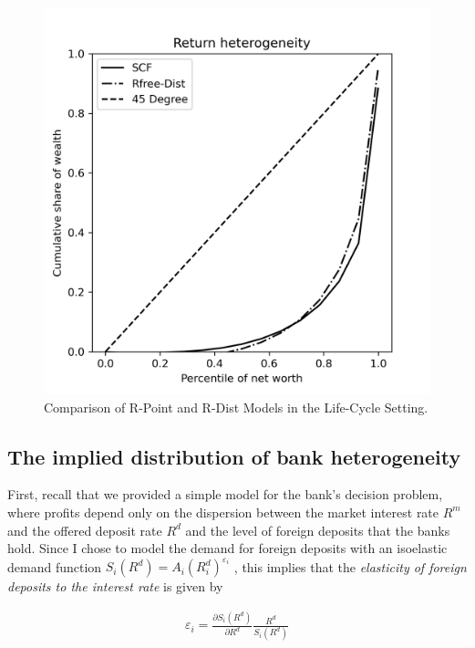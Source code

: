 \begin{figure}[h]
\begin{minipage}{0.48\textwidth}
        \includegraphics[width=\textwidth]{../Figures/LCrrDistNetWorthPlot.png}
    \end{minipage}
    \caption{Comparison of R-Point and R-Dist Models in the Life-Cycle Setting.}
    \label{fig:LCUnif} 
  \end{figure}

  \subsection{The implied distribution of bank heterogeneity}

  \par First, recall that we provided a simple model for the bank's decision problem, where profits depend only on the dispersion between the market interest rate $R^m$ and the offered deposit rate $R^d$ and the level of foreign deposits that the banks hold. Since I chose to model the demand for foreign deposits with an isoelastic demand function $S_i(R^d) = A_i (R_i^d)^{\varepsilon_i}$ , this implies that the \textit{elasticity of foreign deposits to the interest rate} is given by

  \begin{align}
    \varepsilon_i = \frac{\partial S_i(R^d)}{\partial R^d} \frac{R^d}{S_i(R^d)}
  \end{align}

